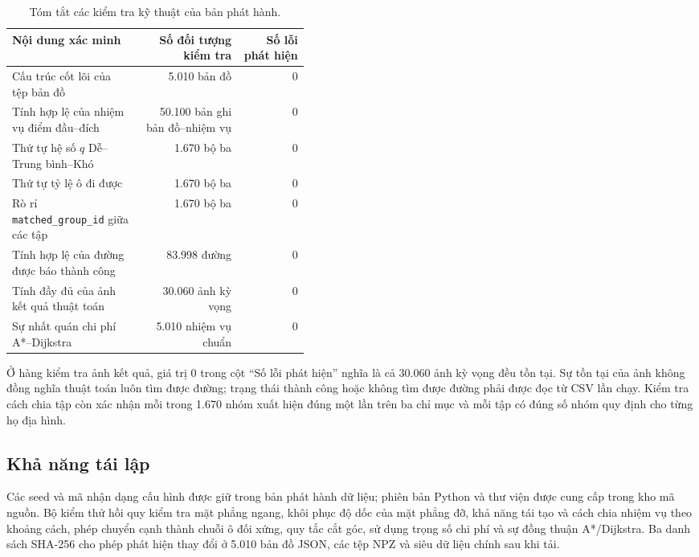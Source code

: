 \documentclass[11pt]{article}
\begin{document}
\begin{table}[htbp]
  \centering
  \caption{Tóm tắt các kiểm tra kỹ thuật của bản phát hành.}
  \label{tab:validation-summary}
  \small
  \begin{tabular}{L{0.43\linewidth}r r}
    \toprule
    Nội dung xác minh & Số đối tượng kiểm tra & Số lỗi phát hiện \\
    \midrule
    Cấu trúc cốt lõi của tệp bản đồ & 5.010 bản đồ & 0 \\
    Tính hợp lệ của nhiệm vụ điểm đầu--đích & 50.100 bản ghi bản đồ--nhiệm vụ & 0 \\
    Thứ tự hệ số $q$ Dễ--Trung bình--Khó & 1.670 bộ ba & 0 \\
    Thứ tự tỷ lệ ô đi được & 1.670 bộ ba & 0 \\
    Rò rỉ \texttt{matched\_group\_id} giữa các tập & 1.670 bộ ba & 0 \\
    Tính hợp lệ của đường được báo thành công & 83.998 đường & 0 \\
    Tính đầy đủ của ảnh kết quả thuật toán & 30.060 ảnh kỳ vọng & 0 \\
    Sự nhất quán chi phí A*--Dijkstra & 5.010 nhiệm vụ chuẩn & 0 \\
    \bottomrule
  \end{tabular}
\end{table}

Ở hàng kiểm tra ảnh kết quả, giá trị 0 trong cột ``Số lỗi phát hiện'' nghĩa là cả
30.060 ảnh kỳ vọng đều tồn tại. Sự tồn tại của ảnh không đồng nghĩa thuật toán
luôn tìm được đường; trạng thái thành công hoặc không tìm được đường phải được
đọc từ CSV lần chạy.
Kiểm tra cách chia tập còn xác nhận mỗi trong 1.670 nhóm xuất hiện đúng một lần
trên ba chỉ mục và mỗi tập có đúng số nhóm quy định cho từng họ địa hình.

\subsection{Khả năng tái lập}

Các seed và mã nhận dạng cấu hình được giữ trong bản phát hành dữ liệu; phiên bản
Python và thư viện được cung cấp trong kho mã nguồn. Bộ kiểm thử hồi quy kiểm tra
mặt phẳng ngang, khôi phục độ dốc của mặt
phẳng đỡ, khả năng tái tạo và cách chia nhiệm vụ theo khoảng cách, phép chuyển cạnh thành chuỗi ô đối xứng, quy tắc
cắt góc, sử dụng trọng số chi phí và sự đồng thuận A*/Dijkstra. Ba danh sách
SHA-256 cho phép phát hiện thay đổi ở 5.010 bản đồ JSON, các tệp NPZ và siêu dữ liệu
chính sau khi tải.
\end{document}
